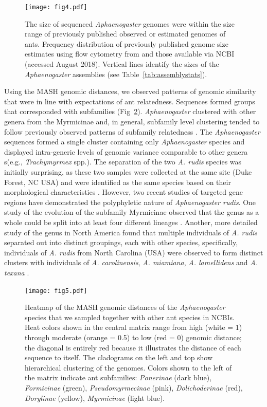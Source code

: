 \documentclass[fleqn,10pt,lineno]{wlpeerj} %
\begin{document}
\begin{figure}[ht]
\texttt{[image: fig4.pdf]}
\caption{The size of sequenced \textit{Aphaenogaster} genomes were
  within the size range of previously published observed or estimated
  genomes of ants. Frequency distribution of previously published
  genome size estimates using flow cytometry from \cite{Tsutsui2008a}
  and those available via NCBI (accessed August 2018). Vertical lines
  identify the sizes of the \textit{Aphaenogaster} assemblies (see
  Table~\ref{tab:assemblystats}).}
\label{fig:ncbi_compare}
\end{figure}


Using the MASH genomic distances, we observed patterns of genomic
similarity that were in line with expectations of ant
relatedness. Sequences formed groups that corresponded with
subfamilies (Fig~\ref{fig:all_heat}). \textit{Aphaenogaster} clustered
with other genera from the Myrmicinae and, in general, subfamily level
clustering tended to follow previously observed patterns of subfamily
relatedness \citep{Bolton2006, Moreau2006, Ward2014}.  The
\emph{Aphaenogaster} sequences formed a single cluster containing only
\emph{Aphaenogaster} species and displayed intra-generic levels of
genomic variance comparable to other genera s(e.g.,
\textit{Trachymyrmex} spp.). The separation of the two
\textit{A. rudis} species was initially surprising, as these two
samples were collected at the same site (Duke Forest, NC USA) and were
identified as the same species based on their morphological
characteristics \citep{Ellison2012, Demarco2016}. However, two recent
studies of targeted gene regions have demonstrated the polyphyletic
nature of \textit{Aphaenogaster rudis}.  One study of the evolution of
the subfamily Myrmicinae observed that the genus as a whole could be
split into at least four different lineages \citep{Ward2015}. Another,
more detailed study of the genus in North America found that multiple
individuals of \textit{A. rudis} separated out into distinct
groupings, each with other species, specifically, individuals of
\textit{A. rudis} from North Carolina (USA) were observed to form
distinct clusters with individuals of \textit{A. carolinensis},
\textit{A. miamiana}, \textit{A. lamellidens} and \textit{A. texana}
\citep{Demarco2016}.


\begin{figure}[ht]
\texttt{[image: fig5.pdf]}
\caption{Heatmap of the MASH genomic distances of the
  \textit{Aphaenogaster} species that we sampled together with other
  ant species in NCBIs. Heat colors shown in the central matrix range
  from high (white = 1) through moderate (orange = 0.5) to low (red =
  0) genomic distance; the diagonal is entirely red because it
  illustrates the distance of each sequence to itself. The cladograms
  on the left and top show hierarchical clustering of the
  genomes. Colors shown to the left of the matrix indicate ant
  subfamilies:  \emph{Ponerinae} (dark blue), \emph{Formicinae}
  (green), \emph{Pseudomyrmecinae} (pink), \emph{Dolichoderinae}
  (red), \emph{Dorylinae} (yellow), \emph{Myrmicinae} (light blue).}
\label{fig:all_heat}
\end{figure}
\end{document}
